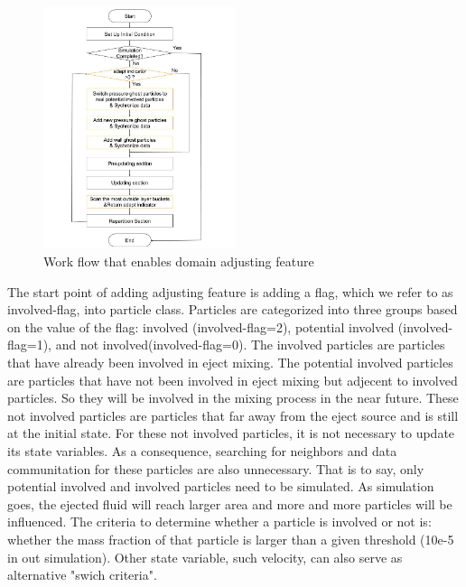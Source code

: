 \documentclass[10pt,a4paper]{article}
\begin{document}
\begin{figure}[h]
\caption{Work flow that enables domain adjusting feature}
\centering
\label{fig:Work_flow_adjust}
\includegraphics[width=0.5\textwidth]{Work_flow_adjust}
\end{figure}
The start point of adding adjusting feature is adding a flag, which we refer to as involved-flag, into particle class. Particles are categorized into three groups based on the value of the flag: involved (involved-flag=2), potential involved (involved-flag=1), and not involved(involved-flag=0). The involved particles are particles that have already been involved in eject mixing. The potential involved particles are particles that have not been involved in eject mixing but adjecent to involved particles. So they will be involved in the mixing process in the near future. These not involved particles are particles that far away from the eject source and is still at the initial state. For these not involved particles, it is not necessary to update its state variables. As a consequence, searching for neighbors and data communitation for these particles are also unnecessary. That is to say, only potential involved and involved particles need to be simulated.
As simulation goes, the ejected fluid will reach larger area and more and more particles will be influenced. The criteria to determine whether a particle is involved or not is: whether the mass fraction of that particle is larger than a given threshold (10e-5 in out simulation). Other state variable, such velocity, can also serve as alternative "swich criteria".\\
\end{document}

